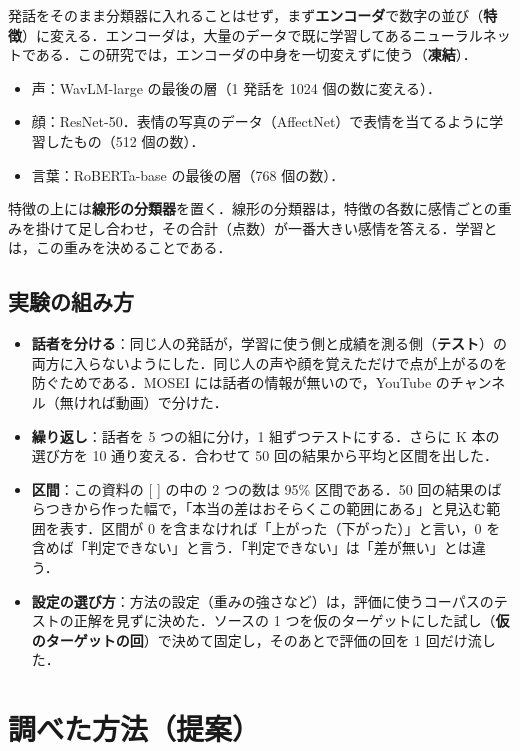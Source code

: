 \documentclass[a4paper,11pt]{ltjsarticle}
\begin{document}
発話をそのまま分類器に入れることはせず，まず\textbf{エンコーダ}で数字の並び（\textbf{特徴}）に変える．エンコーダは，大量のデータで既に学習してあるニューラルネットである．この研究では，エンコーダの中身を一切変えずに使う（\textbf{凍結}）．
\begin{itemize}
  \item 声：WavLM-large の最後の層（1 発話を 1024 個の数に変える）．
  \item 顔：ResNet-50．表情の写真のデータ（AffectNet）で表情を当てるように学習したもの（512 個の数）．
  \item 言葉：RoBERTa-base の最後の層（768 個の数）．
\end{itemize}
特徴の上には\textbf{線形の分類器}を置く．線形の分類器は，特徴の各数に感情ごとの重みを掛けて足し合わせ，その合計（点数）が一番大きい感情を答える．学習とは，この重みを決めることである．

\subsection{実験の組み方}

\begin{itemize}
  \item \textbf{話者を分ける}：同じ人の発話が，学習に使う側と成績を測る側（\textbf{テスト}）の両方に入らないようにした．同じ人の声や顔を覚えただけで点が上がるのを防ぐためである．MOSEI には話者の情報が無いので，YouTube のチャンネル（無ければ動画）で分けた．
  \item \textbf{繰り返し}：話者を 5 つの組に分け，1 組ずつテストにする．さらに K 本の選び方を 10 通り変える．合わせて 50 回の結果から平均と区間を出した．
  \item \textbf{区間}：この資料の [ ] の中の 2 つの数は 95\% 区間である．50 回の結果のばらつきから作った幅で，「本当の差はおそらくこの範囲にある」と見込む範囲を表す．区間が 0 を含まなければ「上がった（下がった）」と言い，0 を含めば「判定できない」と言う．「判定できない」は「差が無い」とは違う．
  \item \textbf{設定の選び方}：方法の設定（重みの強さなど）は，評価に使うコーパスのテストの正解を見ずに決めた．ソースの 1 つを仮のターゲットにした試し（\textbf{仮のターゲットの回}）で決めて固定し，そのあとで評価の回を 1 回だけ流した．
\end{itemize}

\section{調べた方法（提案）}
\end{document}

